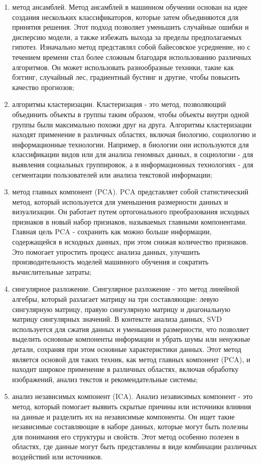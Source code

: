 \begin{enumerate}
	\item метод ансамблей. Метод ансамблей в машинном обучении основан на идее создания нескольких классификаторов, которые затем объединяются для принятия решения. Этот подход позволяет уменьшить случайные ошибки и дисперсию модели, а также избежать выхода за пределы предполагаемых гипотез. Изначально метод представлял собой байесовское усреднение, но с течением времени стал более сложным благодаря использованию различных алгоритмов. Он может использовать разнообразные техники, такие как бэггинг, случайный лес, градиентный бустинг и другие, чтобы повысить качество прогнозов;
	\item алгоритмы кластеризации. Кластеризация - это метод, позволяющий объединить объекты в группы таким образом, чтобы объекты внутри одной группы были максимально похожи друг на друга. Алгоритмы кластеризации находят применение в различных областях, включая биологию, социологию и информационные технологии. Например, в биологии они используются для классификации видов или для анализа геномных данных, в социологии - для выявления социальных группировок, а в информационных технологиях - для сегментации пользователей или анализа текстовой информации;
	\item метод главных компонент (PCA). PCA представляет собой статистический метод, который используется для уменьшения размерности данных и визуализации. Он работает путем ортогонального преобразования исходных признаков в новый набор признаков, называемых главными компонентами. Главная цель PCA - сохранить как можно больше информации, содержащейся в исходных данных, при этом снижая количество признаков. Это помогает упростить процесс анализа данных, улучшить производительность моделей машинного обучения и сократить вычислительные затраты;
	\item сингулярное разложение. Сингулярное разложение - это метод линейной алгебры, который разлагает матрицу на три составляющие: левую сингулярную матрицу, правую сингулярную матрицу и диагональную матрицу сингулярных значений. В контексте анализа данных, SVD используется для сжатия данных и уменьшения размерности, что позволяет выделить основные компоненты информации и убрать шумы или ненужные детали, сохраняя при этом основные характеристики данных. Этот метод является основой для таких техник, как метод главных компонент (PCA), и находит широкое применение в различных областях, включая обработку изображений, анализ текстов и рекомендательные системы;
	\item анализ независимых компонент (ICA). Анализ независимых компонент - это метод, который помогает выявить скрытые причины или источники влияния на данные и разделить их на независимые компоненты. Он ищет такие независимые составляющие в наборе данных, которые могут быть полезны для понимания его структуры и свойств. Этот метод особенно полезен в областях, где данные могут быть представлены в виде комбинации различных воздействий или источников.
\end{enumerate}

